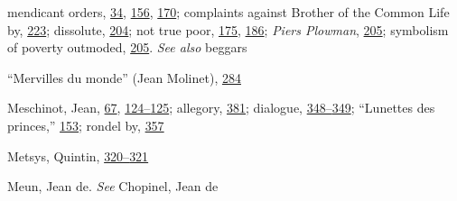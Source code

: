 mendicant orders,
\protect\hyperlink{09_Chapter_Two__THE_CRAVING_FOR_A_M.xhtmlux5cux23page_34}{34},
\protect\hyperlink{12_Chapter_Five__THE_VISION_OF_DEAT.xhtmlux5cux23page_156}{156},
\protect\hyperlink{12_Chapter_Five__THE_VISION_OF_DEAT.xhtmlux5cux23page_170}{170};
complaints against Brother of the Common Life by,
\protect\hyperlink{15_Chapter_Eight__RELIGIOUS_EXCITAT.xhtmlux5cux23page_223}{223};
dissolute,
\protect\hyperlink{14_Chapter_Seven__THE_PIOUS_PERSONA.xhtmlux5cux23page_204}{204};
not true poor,
\protect\hyperlink{13_Chapter_Six__THE_DEPICTION_OF_TH.xhtmlux5cux23page_175}{175},
\protect\hyperlink{13_Chapter_Six__THE_DEPICTION_OF_TH.xhtmlux5cux23page_186}{186};
\emph{Piers Plowman},
\protect\hyperlink{14_Chapter_Seven__THE_PIOUS_PERSONA.xhtmlux5cux23page_205}{205};
symbolism of poverty outmoded,
\protect\hyperlink{14_Chapter_Seven__THE_PIOUS_PERSONA.xhtmlux5cux23page_205}{205}.
\emph{See also} beggars

``Mervilles du monde'' (Jean Molinet),
\protect\hyperlink{18_Chapter_Eleven__THE_FORMS_OF_THO.xhtmlux5cux23page_284}{284}

Meschinot, Jean,
\protect\hyperlink{10_Chapter_Three__THE_HEROIC_DREAM.xhtmlux5cux23page_67}{67},
\protect\hyperlink{10_Chapter_Three__THE_HEROIC_DREAM.xhtmlux5cux23page_124}{124--}\protect\hyperlink{10_Chapter_Three__THE_HEROIC_DREAM.xhtmlux5cux23page_125}{125};
allegory,
\protect\hyperlink{21_Chapter_Thirteen__IMAGE_AND_WORD.xhtmlux5cux23page_381}{381};
dialogue,
\protect\hyperlink{21_Chapter_Thirteen__IMAGE_AND_WORD.xhtmlux5cux23page_348}{348--}\protect\hyperlink{21_Chapter_Thirteen__IMAGE_AND_WORD.xhtmlux5cux23page_349}{349};
``Lunettes des princes,''
\protect\hyperlink{11_Chapter_Four__THE_FORMS_OF_LOVE.xhtmlux5cux23page_153}{153};
rondel by,
\protect\hyperlink{21_Chapter_Thirteen__IMAGE_AND_WORD.xhtmlux5cux23page_357}{357}

Metsys, Quintin,
\protect\hyperlink{20_ILLUSTRATIONS_FOLLOW_PAGE.xhtmlux5cux23page_320}{320--}\protect\hyperlink{20_ILLUSTRATIONS_FOLLOW_PAGE.xhtmlux5cux23page_321}{321}

Meun, Jean de. \emph{See} Chopinel, Jean de

